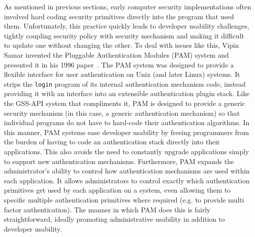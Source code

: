 \documentclass{sig-alternate}
\begin{document}
As mentioned in previous sections, early computer security
implementations often involved hard coding security primitives
directly into the program that used them. Unfortunately, this practice
quickly leads to developer usability challenges, tightly coupling
security policy with security mechanism and making it difficult to
update one without changing the other. To deal with issues like this,
Vipin Samar invented the Pluggable Authentication Modules (PAM) system
and presented it in his 1996 paper~\cite{Samar1996}. The PAM system
was designed to provide a flexible interface for user authentication
on Unix (and later Linux) systems. It strips the \texttt{login}
program of its internal authentication mechanism code, instead
providing it with an interface into an extensible authentication
plugin stack. Like the GSS-API system that compliments it, PAM is
designed to provide a generic security mechanism (in this case, a
generic authentication mechanism) so that individual programs do not
have to hard-code their authentication algorithms. In this manner, PAM
systems ease developer usability by freeing programmers from the
burden of having to code an authentication stack directly into their
applications. This also avoids the need to constantly upgrade
applications simply to support new authentication
mechanisms. Furthermore, PAM expands the administrator's ability to
control how authentication mechanisms are used within each
application. It allows administrators to control exactly which
authentication primitives get used by each application on a system,
even allowing them to specific multiple authentication primitives
where required (e.g. to provide multi factor authentication). The
manner in which PAM does this is fairly straightforward, ideally
promoting administrative usability in addition to developer usability.
\end{document}
